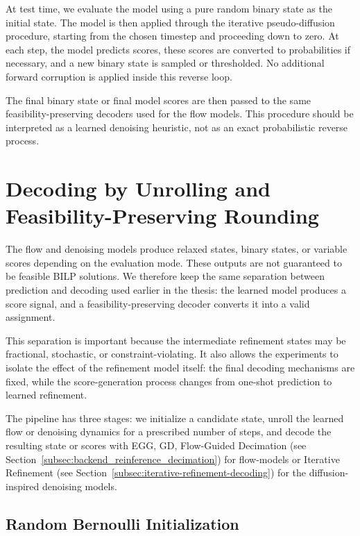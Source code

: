 At test time, we evaluate the model using a pure random binary state as the initial state. The model is then applied through the iterative pseudo-diffusion procedure, starting from the chosen timestep and proceeding down to zero. At each step, the model predicts scores, these scores are converted to probabilities if necessary, and a new binary state is sampled or thresholded. No additional forward corruption is applied inside this reverse loop.

The final binary state or final model scores are then passed to the same feasibility-preserving decoders used for the flow models. This procedure should be interpreted as a learned denoising heuristic, not as an exact probabilistic reverse process.

\section{Decoding by Unrolling and Feasibility-Preserving Rounding}
\label{sec:chapter_4_unrolling_decoding}

The flow and denoising models produce relaxed states, binary states, or variable scores depending on the evaluation mode. These outputs are not guaranteed to be feasible BILP solutions. We therefore keep the same separation between prediction and decoding used earlier in the thesis: the learned model produces a score signal, and a feasibility-preserving decoder converts it into a valid assignment.

This separation is important because the intermediate refinement states may be fractional, stochastic, or constraint-violating. It also allows the experiments to isolate the effect of the refinement model itself: the final decoding mechanisms are fixed, while the score-generation process changes from one-shot prediction to learned refinement.

The pipeline has three stages: we initialize a candidate state, unroll the learned flow or denoising dynamics for a prescribed number of steps, and decode the resulting state or scores with EGG, GD, Flow-Guided Decimation (see Section~\ref{subsec:backend_reinference_decimation}) for flow-models or Iterative Refinement (see Section~\ref{subsec:iterative-refinement-decoding}) for the diffusion-inspired denoising models.

\subsection{Random Bernoulli Initialization}

